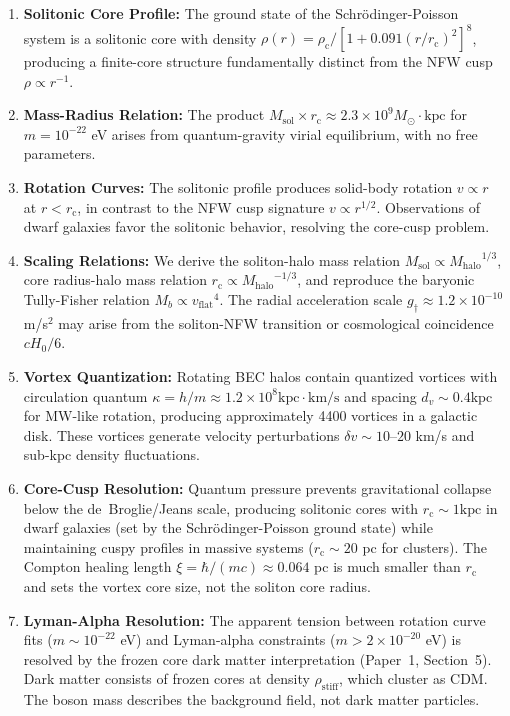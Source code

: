 \documentclass[11pt,a4paper]{article}
\newcommand{\rhostiff}{\ensuremath{\rho_{\mathrm{stiff}}}}
\newcommand{\Msun}{\ensuremath{M_\odot}}
\newcommand{\Msol}{\ensuremath{M_{\mathrm{sol}}}}
\newcommand{\Mhalo}{\ensuremath{M_{\mathrm{halo}}}}
\newcommand{\kpc}{\ensuremath{\mathrm{kpc}}}
\newcommand{\rc}{\ensuremath{r_{\mathrm{c}}}}
\newcommand{\rhoc}{\ensuremath{\rho_{\mathrm{c}}}}
\newcommand{\vflat}{\ensuremath{v_{\mathrm{flat}}}}
\newcommand{\gdagger}{\ensuremath{g_{\dagger}}}
\theoremstyle{definition}
\theoremstyle{remark}
\begin{document}
\begin{enumerate}[leftmargin=*, itemsep=0.3em]

\item \textbf{Solitonic Core Profile:} The ground state of the Schr\"odinger-Poisson system is a solitonic core with density $\rho(r) = \rhoc/[1 + 0.091(r/\rc)^2]^8$, producing a finite-core structure fundamentally distinct from the NFW cusp $\rho \propto r^{-1}$.

\item \textbf{Mass-Radius Relation:} The product $\Msol \times \rc \approx 2.3 \times 10^9 \Msun \cdot \kpc$ for $m = 10^{-22}$ eV arises from quantum-gravity virial equilibrium, with no free parameters.

\item \textbf{Rotation Curves:} The solitonic profile produces solid-body rotation $v \propto r$ at $r < \rc$, in contrast to the NFW cusp signature $v \propto r^{1/2}$. Observations of dwarf galaxies favor the solitonic behavior, resolving the core-cusp problem.

\item \textbf{Scaling Relations:} We derive the soliton-halo mass relation $\Msol \propto \Mhalo^{1/3}$, core radius-halo mass relation $\rc \propto \Mhalo^{-1/3}$, and reproduce the baryonic Tully-Fisher relation $M_b \propto \vflat^4$. The radial acceleration scale $\gdagger \approx 1.2 \times 10^{-10}$ m/s$^2$ may arise from the soliton-NFW transition or cosmological coincidence $cH_0/6$.

\item \textbf{Vortex Quantization:} Rotating BEC halos contain quantized vortices with circulation quantum $\kappa = h/m \approx 1.2 \times 10^8 \kpc \cdot \text{km/s}$ and spacing $d_v \sim 0.4 \kpc$ for MW-like rotation, producing approximately 4400 vortices in a galactic disk. These vortices generate velocity perturbations $\delta v \sim 10$--$20$ km/s and sub-kpc density fluctuations.

\item \textbf{Core-Cusp Resolution:} Quantum pressure prevents gravitational collapse below the de~Broglie/Jeans scale, producing solitonic cores with $\rc \sim 1 \kpc$ in dwarf galaxies (set by the Schr\"odinger-Poisson ground state) while maintaining cuspy profiles in massive systems ($\rc \sim 20$ pc for clusters).  The Compton healing length $\xi = \hbar/(mc) \approx 0.064$ pc is much smaller than $\rc$ and sets the vortex core size, not the soliton core radius.

\item \textbf{Lyman-Alpha Resolution:} The apparent tension between rotation curve fits ($m \sim 10^{-22}$ eV) and Lyman-alpha constraints ($m > 2 \times 10^{-20}$ eV) is resolved by the frozen core dark matter interpretation (Paper~1, Section~5). Dark matter consists of frozen cores at density $\rhostiff$, which cluster as CDM. The boson mass describes the background field, not dark matter particles.

\end{enumerate}
\end{document}
